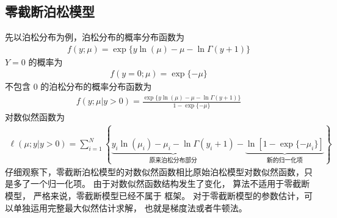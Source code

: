 \documentclass[letterpaper,10pt,english]{sphinxmanual}
\begin{document}
\subsection{零截断泊松模型}
\label{\detokenize{_u96f6_u8ba1_u6570_u95ee_u9898/content:id3}}
先以泊松分布为例，泊松分布的概率分布函数为
\begin{equation}\label{equation:零计数问题/content:eq_zero_counts_002}
\begin{split}f(y;\mu)=\exp \{ y\ln(\mu) -\mu- \ln \Gamma(y+1)   \}\end{split}
\end{equation}
\(Y=0\) 的概率为
\begin{equation}\label{equation:零计数问题/content:eq_zero_counts_003}
\begin{split}f(y=0;\mu)=\exp \{  -\mu   \}\end{split}
\end{equation}
不包含 \(0\) 的泊松分布的概率分布函数为
\begin{equation}\label{equation:零计数问题/content:eq_zero_counts_004}
\begin{split}f(y;\mu|y>0)=\frac{\exp \{ y\ln(\mu) -\mu- \ln \Gamma(y+1)   \}}{1-\exp \{  -\mu   \}}\end{split}
\end{equation}
对数似然函数为
\begin{equation}\label{equation:零计数问题/content:eq_zero_counts_005}
\begin{split}\ell(\mu;y|y>0) = \sum_{i=1}^N
\left \{
    \underbrace{ y_i\ln(\mu_i) -\mu_i- \ln \Gamma(y_i+1)}_{\text{原来泊松分布部分}}
- \underbrace{\ln [1-\exp \{  -\mu_i   \}]}_{\text{新的归一化项}}
\right \}\end{split}
\end{equation}
仔细观察下，零截断泊松模型的对数似然函数相比原始泊松模型对数似然函数，只是多了一个归一化项。
由于对数似然函数结构发生了变化，
 算法不适用于零截断模型，
严格来说，零截断模型已经不属于  框架。
对于零截断模型的参数估计，可以单独运用完整最大似然估计求解，
也就是梯度法或者牛顿法。
\end{document}
